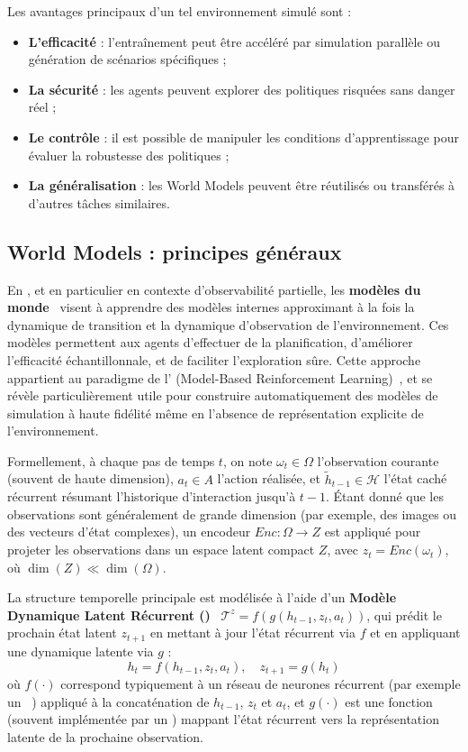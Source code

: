 Les avantages principaux d'un tel environnement simulé sont :
\begin{itemize}
    \item \textbf{L'efficacité} : l'entraînement peut être accéléré par simulation parallèle ou génération de scénarios spécifiques ;
    \item \textbf{La sécurité} : les agents peuvent explorer des politiques risquées sans danger réel ;
    \item \textbf{Le contrôle} : il est possible de manipuler les conditions d'apprentissage pour évaluer la robustesse des politiques ;
    \item \textbf{La généralisation} : les World Models peuvent être réutilisés ou transférés à d'autres tâches similaires.
\end{itemize}

\subsection{World Models : principes généraux}

En , et en particulier en contexte d'observabilité partielle, les \textbf{modèles du monde}~\cite{ha2018recurrent, hafner2020dream} visent à apprendre des modèles internes approximant à la fois la dynamique de transition et la dynamique d'observation de l'environnement. Ces modèles permettent aux agents d'effectuer de la planification, d'améliorer l'efficacité échantillonnale, et de faciliter l'exploration sûre. Cette approche appartient au paradigme de l' (Model-Based Reinforcement Learning)~\cite{moerland2020model}, et se révèle particulièrement utile pour construire automatiquement des modèles de simulation à haute fidélité même en l'absence de représentation explicite de l'environnement.

Formellement, à chaque pas de temps $t$, on note $\omega_t \in \Omega$ l'observation courante (souvent de haute dimension), $a_t \in A$ l'action réalisée, et $\tilde{h}_{t-1} \in \mathcal{H}$ l'état caché récurrent résumant l'historique d'interaction jusqu'à $t-1$. Étant donné que les observations sont généralement de grande dimension (par exemple, des images ou des vecteurs d'état complexes), un encodeur $Enc: \Omega \rightarrow Z$ est appliqué pour projeter les observations dans un espace latent compact $Z$, avec $z_t = Enc(\omega_t)$, où $\dim(Z) \ll \dim(\Omega)$.

La structure temporelle principale est modélisée à l'aide d'un \textbf{Modèle Dynamique Latent Récurrent ()}~\cite{hafner2020dream} $\mathcal{T}^{z} = f(g(h_{t-1}, z_t, a_t))$, qui prédit le prochain état latent $z_{t+1}$ en mettant à jour l'état récurrent via $f$ et en appliquant une dynamique latente via $g$ :
\[
h_t = f(h_{t-1}, z_t, a_t), \quad z_{t+1} = g(h_t)
\]
où $f(\cdot)$ correspond typiquement à un réseau de neurones récurrent (par exemple un ~\cite{hochreiter1997long}) appliqué à la concaténation de $h_{t-1}$, $z_t$ et $a_t$, et $g(\cdot)$ est une fonction (souvent implémentée par un ) mappant l'état récurrent vers la représentation latente de la prochaine observation.

